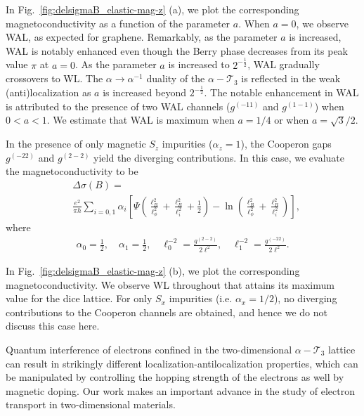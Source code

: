 \documentclass[aps,prb,amsmath,amssymb,footinbib,showpacs,twocolumn]{revtex4-2}
\begin{document}
In Fig.~\ref{fig:delsigmaB_elastic-mag-z} (a), we plot the corresponding magnetoconductivity as a function of the parameter $a$. When $a=0$, we observe WAL, as expected for graphene. Remarkably, as the parameter $a$ is increased, WAL is notably enhanced even though the Berry phase decreases from its peak value $\pi$ at $a=0$. As the parameter $a$ is increased to $2^{-\frac{1}{2}}$, WAL gradually crossovers to WL. The $\alpha\rightarrow \alpha^{-1}$ duality of the $\alpha-\mathcal{T}_3$ is reflected in the weak (anti)localization as $a$ is increased beyond $2^{-\frac{1}{2}}$. The notable enhancement in WAL is attributed to the presence of two WAL channels ($g^{(-11)}$ and $g^{(1-1)}$) when $0<a<1$. We estimate that WAL is maximum when $a=1/4$ or when $a=\sqrt{3}/2$.

In the presence of only magnetic $S_z$ impurities ($\alpha_z=1$), the Cooperon gaps $g^{(-22)}$ and $g^{(2-2)}$ yield the diverging contributions. In this case, we evaluate the magnetoconductivity to be~\cite{SI} 
\begin{align}
    &\Delta\sigma(B) =\nonumber\\
    &\frac{e^{2}}{\pi h}\sum_{i=0, 1}\alpha_{i}\left[\Psi\left(\frac{\ell^{2}_{B}}{\ell^{2}_{\phi}}+\frac{\ell^{2}_{B}}{\ell^{2}_{i}}+\frac{1}{2}\right)-\ln\left(\frac{\ell^{2}_{B}}{\ell^{2}_{\phi}}+\frac{\ell^{2}_{B}}{\ell^{2}_{i}}\right)\right],
\end{align}
where 
\begin{align}
      \alpha_{0}= \frac{1}{2}, \quad \alpha_{1}= \frac{1}{2},\quad
     \ell^{-2}_{0}=\frac{g^{(2-2)}}{2\ell^{2}} , \quad \ell^{-2}_{1} =\frac{g^{(-22)}}{2\ell^{2}}.
\end{align}

In Fig.~\ref{fig:delsigmaB_elastic-mag-z} (b), we plot the corresponding magnetoconductivity. We observe WL throughout that attains its maximum value for the dice lattice. For only $S_x$ impurities (i.e. $\alpha_x=1/2$), no diverging contributions to the Cooperon channels are obtained, and hence we do not discuss this case here. 

Quantum interference of electrons confined in the two-dimensional $\alpha-\mathcal{T}_3$ lattice can result in strikingly different localization-antilocalization properties, which can be manipulated by controlling the hopping strength of the electrons as well by magnetic doping. 
Our work makes an important advance in the study of electron transport in two-dimensional materials. 
\end{document}
